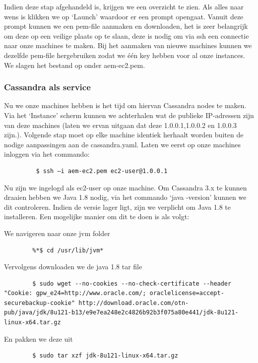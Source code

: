 \documentclass{article}
\begin{document}
	\par
	Indien deze stap afgehandeld is, krijgen we een overzicht te zien. 
	Als alles naar wens is klikken we op ‘Launch’ waardoor er een prompt opengaat. 
	Vanuit deze prompt kunnen we een pem-file aanmaken en downloaden, het is zeer belangrijk om 
	deze op een veilige plaats op te slaan, deze is nodig om via ssh een connectie naar onze machines te maken. 
	Bij het aanmaken van nieuwe machines kunnen we dezelfde pem-file hergebruiken zodat we \'e\'en key hebben voor al onze instances.
	 We slagen het bestand op onder aem-ec2.pem.
	
	\subsubsection{Cassandra als service}
	Nu we onze machines hebben is het tijd om hiervan Cassandra nodes te maken. 
	Via het ‘Instance’ scherm kunnen we achterhalen wat de publieke IP-adressen zijn van deze machines 
	(laten we ervan uitgaan dat deze 1.0.0.1,1.0.0.2 en 1.0.0.3 zijn.). 
	Volgende stap moet op elke machine identiek herhaalt worden buiten de nodige aanpassingen aan de cassandra.yaml. 
	Laten we eerst op onze machines inloggen via het commando:
	
	\begin{lstlisting}
		 $ ssh –i aem-ec2.pem ec2-user@1.0.0.1
	\end{lstlisting}
	
	Nu zijn we ingelogd als ec2-user op onze machine. Om Cassandra 3.x te kunnen draaien hebben we Java 1.8 nodig, 
	via het commando ‘java -version’ kunnen we dit controleren. 
	Indien de versie lager ligt, zijn we verplicht om Java 1.8 te installeren. Een mogelijke manier om dit te doen is als volgt:	
	\par
	We navigeren naar onze jvm folder
	\begin{lstlisting}
  		%*$ cd /usr/lib/jvm*
	\end{lstlisting}
	\par
	Vervolgens downloaden we de java 1.8 tar file
	\begin{lstlisting}
		$ sudo wget --no-cookies --no-check-certificate --header "Cookie: gpw_e24=http://www.oracle.com/; oraclelicense=accept-securebackup-cookie" http://download.oracle.com/otn-pub/java/jdk/8u121-b13/e9e7ea248e2c4826b92b3f075a80e441/jdk-8u121-linux-x64.tar.gz
	\end{lstlisting}
	
	\par
	En pakken we deze uit
	\begin{lstlisting}
		$ sudo tar xzf jdk-8u121-linux-x64.tar.gz
	\end{lstlisting}
	
\end{document}
